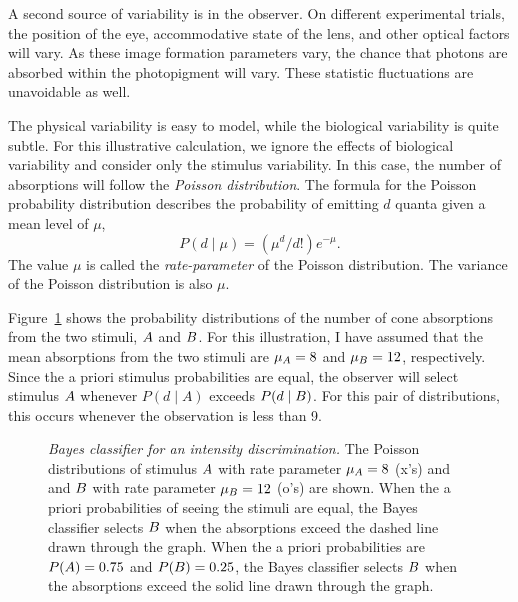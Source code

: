 A second source of variability is in the observer.  On different
experimental trials, the position of the eye, accommodative state of
the lens, and other optical factors will vary.  As these image
formation parameters vary, the chance that photons are absorbed within
the photopigment will vary.  These statistic fluctuations are
unavoidable as well.

The physical variability is easy to model, while the biological
variability is quite subtle.  For this illustrative calculation, we
ignore the effects of biological variability and consider only the
stimulus variability.  In this case, the number of absorptions will
follow the {\em Poisson distribution}.  The formula for the Poisson
probability distribution describes the probability of emitting $d$
quanta given a mean level of $\mu$,
\begin{equation}
\label{ea3:Poisson}
P(d \mid {\mu}) = ( {\mu}^{d} / d ! ) e^{- \mu} .
\end{equation}
The value $\mu$ is called the {\em rate-parameter} of the Poisson
distribution.  The variance of the Poisson distribution is also $\mu$.

Figure~\ref{fa3:sdt} shows the probability distributions of the number
of cone absorptions from the two stimuli, $\mbox{$A$}$ and $\mbox{$B$}$.  For
this illustration, I have assumed that the mean absorptions from the
two stimuli are $\mu_{A} = 8$ and $\mu_{B} = 12$, respectively.  Since the a
priori stimulus probabilities are equal, the observer will select
stimulus $\mbox{$A$}$ whenever $P(d \mid A)$ exceeds $P(d \mid \mbox{$B$})$.
For this pair of distributions, this occurs whenever the observation
is less than 9.
\begin{figure}
\centerline{
}
\caption[Bayes Classifier for Intensity Discrimination]{
{\em Bayes classifier for an intensity discrimination.}  The Poisson
distributions of stimulus $\mbox{$A$}$ with rate parameter $\mu_{A} = 8$
(x's) and and $\mbox{$B$}$ with rate parameter $\mu_{B} = 12$ (o's) are
shown.  When the a priori probabilities of seeing the stimuli are
equal, the Bayes classifier selects $\mbox{$B$}$ when the absorptions
exceed the dashed line drawn through the graph.  When the a priori
probabilities are $P(\mbox{$A$}) = 0.75$ and $P(\mbox{$B$}) = 0.25$, the Bayes
classifier selects $\mbox{$B$}$ when the absorptions exceed the solid line
drawn through the graph.  }
\label{fa3:sdt}
\end{figure}

